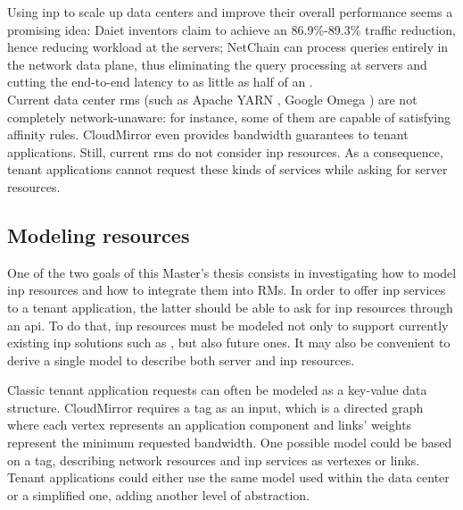 Using \gls{inp} to scale up data centers and improve their overall performance seems a promising idea: Daiet \cite{daiet} inventors claim to achieve an 86.9\%-89.3\% traffic reduction, hence reducing workload at the servers;
NetChain \cite{netchain} can process queries entirely in the network data plane, thus eliminating the query processing at servers and cutting the end-to-end latency to as little as half of an .\\
Current data center \glspl{rm} (such as Apache YARN \cite{yarn}, Google Omega \cite{omega}) are not completely network-unaware: for instance, some of them are capable of satisfying affinity rules.
CloudMirror \cite{cloudmirror} even provides bandwidth guarantees to tenant applications.
Still, current \glspl{rm} do not consider \gls{inp} resources.
As a consequence, tenant applications cannot request these kinds of services while asking for server resources.

\subsection{Modeling \texorpdfstring{}{INP} resources}
One of the two goals of this Master's thesis consists in investigating how to model \gls{inp} resources and how to integrate them into RMs.
In order to offer \gls{inp} services to a tenant application, the latter should be able to ask for \gls{inp} resources through an \gls{api}.
To do that, \gls{inp} resources must be modeled not only to support currently existing \gls{inp} solutions such as \cite{daiet} \cite{netchain} \cite{incbricks} \cite{sharp}, but also future ones. 
It may also be convenient to derive a single model to describe both server and \gls{inp} resources.

Classic tenant application requests can often be modeled as a key-value data structure.
CloudMirror \cite{cloudmirror} requires a \gls{tag} as an input, which is a directed graph where each vertex represents an application component and links' weights represent the minimum requested bandwidth.
One possible model could be based on a \gls{tag}, describing network resources and \gls{inp} services as vertexes or links.
Tenant applications could either use the same model used within the data center or a simplified one, adding another level of abstraction.

